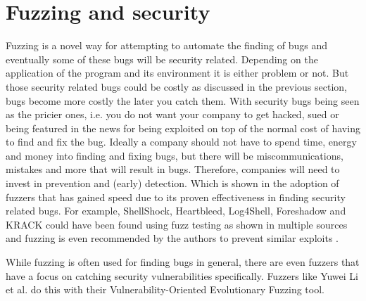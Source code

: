 \section{Fuzzing and security}
\label{intro:FussingSecurity}
Fuzzing is a novel way for attempting to automate the finding of bugs and eventually some of these bugs will be security related. Depending on the application of the program and its environment it is either problem or not. But those security related bugs could be costly as discussed in the previous section, bugs become more costly the later you 
catch them. With security bugs being seen as the pricier ones, i.e. you do not want your company to get hacked, sued or being featured in the news for being exploited on top of the normal cost of having to find and fix the bug. 
Ideally a company should not have to spend time, energy and money into finding and fixing bugs, but there will be miscommunications, mistakes and more that will result in bugs. Therefore, companies will need to invest in prevention and (early) detection. Which is shown in the adoption of fuzzers that has gained speed due to its proven effectiveness in finding security related bugs. For example, ShellShock, Heartbleed, Log4Shell, Foreshadow and KRACK could have been found using fuzz testing as shown in multiple sources \cite{HeartbleedViaFuzzing, 34ForeshadowViaFuzz, ShellShockViaFuzzing, Log4ShellViaFuzzing} and fuzzing is even recommended by the authors to prevent similar exploits \cite{35ForeshadowFuzzRecom, 33KrackViaFuzz}.

While fuzzing is often used for finding bugs in general, there are even fuzzers that have a focus on catching security vulnerabilities specifically. Fuzzers like Yuwei Li et al. \cite{32V-Fuzz} do this with their Vulnerability-Oriented Evolutionary Fuzzing tool.

